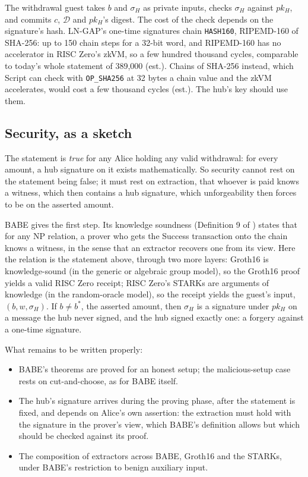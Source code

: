 \documentclass[11pt]{article}
\begin{document}
The withdrawal guest takes $b$ and $\sigma_H$ as private inputs, checks
$\sigma_H$ against $pk_H$, and commits $c$, $\mathcal{D}$ and $pk_H$'s digest. The
cost of the check depends on the signature's hash. LN-GAP's one-time
signatures chain \texttt{HASH160}, RIPEMD-160 of SHA-256: up to 150 chain
steps for a 32-bit word, and RIPEMD-160 has no accelerator in RISC
Zero's zkVM, so a few hundred thousand cycles, comparable to today's
whole statement of 389,000 (est.). Chains of SHA-256 instead, which
Script can check with \texttt{OP\_SHA256} at 32 bytes a chain value and
the zkVM accelerates, would cost a few thousand cycles (est.). The hub's
key should use them.

\subsection{Security, as a sketch}
\label{sec:security}

The statement is \emph{true} for any Alice holding any valid withdrawal:
for every amount, a hub signature on it exists mathematically. So
security cannot rest on the statement being false; it must rest on
extraction, that whoever is paid knows a witness, which then contains a
hub signature, which unforgeability then forces to be on the asserted
amount.

BABE gives the first step. Its knowledge soundness (Definition 9 of
\cite{babe}) states that for any NP relation, a prover who gets the
Success transaction onto the chain knows a witness, in the sense that an
extractor recovers one from its view. Here the relation is the
statement above, through two more layers: Groth16 is knowledge-sound
(in the generic or algebraic group model), so the Groth16 proof yields
a valid RISC Zero receipt; RISC Zero's STARKs are arguments of knowledge
(in the random-oracle model), so the receipt yields the guest's input,
$(b, w, \sigma_H)$. If $b \ne b^*$, the asserted amount, then $\sigma_H$
is a signature under $pk_H$ on a message the hub never signed, and the
hub signed exactly one: a forgery against a one-time signature.

What remains to be written properly:
\begin{itemize}[leftmargin=1.5em]
\item BABE's theorems are proved for an honest setup; the malicious-setup
  case rests on cut-and-choose, as for BABE itself.
\item The hub's signature arrives during the proving phase, after the
  statement is fixed, and depends on Alice's own assertion: the
  extraction must hold with the signature in the prover's view, which
  BABE's definition allows but which should be checked against its
  proof.
\item The composition of extractors across BABE, Groth16 and the STARKs,
  under BABE's restriction to benign auxiliary input.
\end{itemize}
\end{document}
